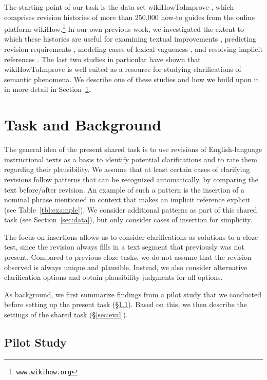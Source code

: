 \documentclass[11pt]{article}
\begin{document}
The starting point of our task is the data set wikiHowToImprove \cite{anthonio-etal-2020-wikihowtoimprove}, which comprises revision histories of more than 250,000 how-to guides from the online platform wikiHow.\footnote{\texttt{www.wikihow.org}} In our own previous work, we  investigated the extent to which these histories are useful for examining textual improvements \cite{anthonio-roth-2020-learn}, predicting revision requirements \cite{bhat-etal-2020-towards}, modeling cases of lexical vagueness \cite{debnath-roth-2021-computational}, and resolving implicit references \cite{anthonio-roth-2021-resolving}. The last two studies in particular have shown that wikiHowToImprove is well suited as a resource for studying clarifications of semantic phenomena. We describe one of these studies and how we build upon it in more detail in Section~\ref{sec:task}.  


\section{Task and Background}
\label{sec:task}

The general idea of the present shared task is to use revisions of English-language instructional texts as a basis to identify potential clarifications and to rate them regarding their plausibility. We assume that at least certain cases of clarifying revisions follow patterns that can be recognized automatically, by comparing the text before/after revision. An example of such a pattern is the insertion of a nominal phrase mentioned in context that makes an implicit reference explicit (see Table~\ref{tbl:example}).
We consider additional patterns as part of this shared task (see Section~\ref{sec:data}), but only consider cases of insertion for simplicity. 

The focus on insertions allows us to consider clarifications as solutions to a cloze test, since the revision always fills in a text segment that previously was not present. Compared to previous cloze tasks, we do not assume that the revision observed is always unique and plausible. Instead, we also consider alternative clarification options and obtain plausibility judgments for all options.

As background, we first summarize findings from a pilot study that we conducted before setting up the present task (\S\ref{subsec:pilot}). Based on this, we then describe the settings of the shared task (\S\ref{sec:eval}).

\subsection{Pilot Study}
\label{subsec:pilot}
\end{document}
